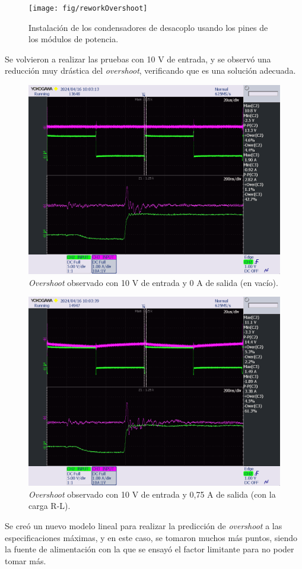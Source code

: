 \begin{figure}[H]
	\centering
	\texttt{[image: fig/reworkOvershoot]}
	\caption{Instalación de los condensadores de desacoplo usando los pines de los módulos de potencia.}
\end{figure}

Se volvieron a realizar las pruebas con 10 V de entrada, y se observó una reducción muy drástica del \textit{overshoot}, verificando que es una solución adecuada.

\begin{figure}[H]
	\centering
	\includegraphics[width=0.7\linewidth]{fig/overshootFinal1}
	\caption{\textit{Overshoot} observado con 10 V de entrada y 0 A de salida (en vacío).}
\end{figure}

\begin{figure}[H]
	\centering
	\includegraphics[width=0.7\linewidth]{fig/overshootFinal2}
	\caption{\textit{Overshoot} observado con 10 V de entrada y 0,75 A de salida (con la carga R-L).}
\end{figure}

Se creó un nuevo modelo lineal para realizar la predicción de \textit{overshoot} a las especificaciones máximas, y en este caso, se tomaron muchos más puntos, siendo la fuente de alimentación con la que se ensayó el factor limitante para no poder tomar más.

